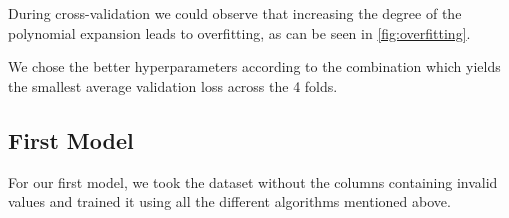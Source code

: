 \documentclass[10pt,conference,compsocconf]{IEEEtran}
\begin{document}
During cross-validation we could observe that increasing the degree of the polynomial expansion leads to overfitting, as can be seen in \autoref{fig:overfitting}.

We chose the better hyperparameters according to the combination which yields the smallest average validation loss across the 4 folds.


\subsection{First Model}
For our first model, we took the dataset without the columns containing invalid values and trained it using all the different algorithms mentioned above.



\end{document}
